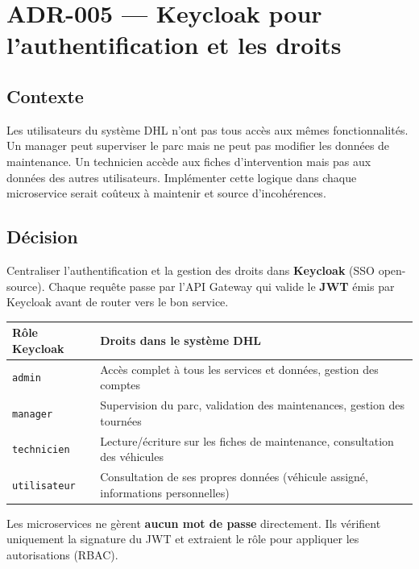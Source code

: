 \documentclass[10pt,a4paper]{article}
\begin{document}
\newpage

\section{ADR-005 --- Keycloak pour l'authentification et les droits}

\subsection{Contexte}
Les utilisateurs du système DHL n'ont pas tous accès aux mêmes fonctionnalités. Un manager peut superviser le parc mais ne peut pas modifier les données de maintenance. Un technicien accède aux fiches d'intervention mais pas aux données des autres utilisateurs. Implémenter cette logique dans chaque microservice serait coûteux à maintenir et source d'incohérences.

\subsection{Décision}
Centraliser l'authentification et la gestion des droits dans \textbf{Keycloak} (SSO open-source). Chaque requête passe par l'API Gateway qui valide le \textbf{JWT} émis par Keycloak avant de router vers le bon service.

\vspace{4pt}
\begin{tabularx}{\linewidth}{lX}
  \toprule
  \small\textbf{Rôle Keycloak} & \small\textbf{Droits dans le système DHL} \\
  \midrule
  \texttt{admin}       & Accès complet à tous les services et données, gestion des comptes \\
  \texttt{manager}     & Supervision du parc, validation des maintenances, gestion des tournées \\
  \texttt{technicien}  & Lecture/écriture sur les fiches de maintenance, consultation des véhicules \\
  \texttt{utilisateur} & Consultation de ses propres données (véhicule assigné, informations personnelles) \\
  \bottomrule
\end{tabularx}

\vspace{4pt}
Les microservices ne gèrent \textbf{aucun mot de passe} directement. Ils vérifient uniquement la signature du JWT et extraient le rôle pour appliquer les autorisations (RBAC).
\end{document}
